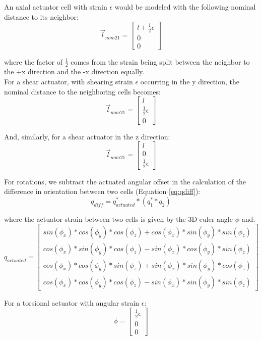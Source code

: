 { An axial actuator cell with strain $\epsilon$ would be modeled with the following nominal distance to its neighbor:
 \[ \vec{l}_{nom21} =  \left[ \begin{array}{ccc}
l+\tfrac{1}{2}\epsilon\\
0\\
0
 \end{array} \right] \]
 
 where the factor of $\tfrac{1}{2}$ comes from the strain being split between the neighbor to the +x direction and the -x direction equally.\\
 
 For a shear actuator, with shearing strain $\epsilon$ occurring in the y direction, the nominal distance to the neighboring cells becomes:
  \[ \vec{l}_{nom21} =  \left[ \begin{array}{ccc}
l\\
\tfrac{1}{2}\epsilon\\
0
 \end{array} \right] \]
 
 And, similarly, for a shear actuator in the z direction:
   \[ \vec{l}_{nom21} =  \left[ \begin{array}{ccc}
l\\
0\\
\tfrac{1}{2}\epsilon
 \end{array} \right] \]
 
 For rotations, we subtract the actuated angular offset in the calculation of the difference in orientation between two cells (Equation \ref{eq:qdiff}):
\[ q_{diff} = q_{actuated}^**(q_1^{*}*q_2)\]

where the actuator strain between two cells is given by the 3D euler angle $\phi$ and:
\[ q_{actuated} = \left[ \begin{array}{ccc}
sin(\phi_x) * cos(\phi_y) * cos(\phi_z) + cos(\phi_x) * sin(\phi_y) * sin(\phi_z)\\
cos(\phi_x) * sin(\phi_y) * cos(\phi_z) - sin(\phi_x) * cos(\phi_y) * sin(\phi_z)\\
cos(\phi_x) * cos(\phi_y) * sin(\phi_z) + sin(\phi_x) * sin(\phi_y) * cos(\phi_z)\\
cos(\phi_x) * cos(\phi_y) * cos(\phi_z) - sin(\phi_x) * sin(\phi_y) * sin(\phi_z)
 \end{array} \right]
\]

For a torsional actuator with angular strain $\epsilon$:
\[ \phi = \left[ \begin{array}{ccc}
\tfrac{1}{2}\epsilon\\
0\\
0
 \end{array} \right]
\]

}
